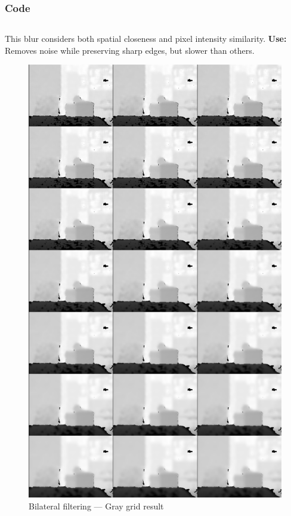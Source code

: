 \documentclass[a4paper,11pt]{article}
\begin{document}
	\subsubsection*{Code}
	\inputminted{python}{Python_Files/07_bilateral_blur.py}
	
	This blur considers both spatial closeness and pixel intensity similarity.  
	\textbf{Use:} Removes noise while preserving sharp edges, but slower than others.

	\begin{figure}[H]
		\centering
		\includegraphics[width=\textwidth,height=0.9\textheight,keepaspectratio]{Images/07_bilateral_gray_grid.png}
		\caption{Bilateral filtering — Gray grid result}
	\end{figure}
	\clearpage
	
\end{document}
